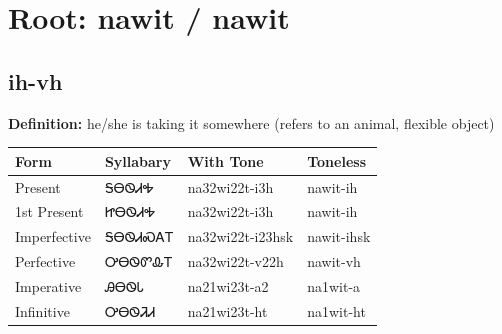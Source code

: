 \documentclass{article}%
\begin{document}
%
\normalsize%
\section*{Root: nawit / nawit}%
\subsection*{ih-vh}%
\textbf{Definition: }%
he/she is taking it somewhere (refers to an animal‚ flexible object)%
\\[0.5em]%
\begin{tabular}{|l|l|l|l|}%
\hline%
\textbf{Form}&\textbf{Syllabary}&\textbf{With Tone}&\textbf{Toneless}\\%
\hline%
Present&ᎦᎾᏫᏗᎭ&na32wi22t{-}i3h&nawit{-}ih\\%
1st Present&ᏥᎾᏫᏗᎭ&na32wi22t{-}i3h&nawit{-}ih\\%
Imperfective&ᎦᎾᏫᏗᏍᎪᎢ&na32wi22t{-}i23hsk&nawit{-}ihsk\\%
Perfective&ᎤᎾᏫᏛᎲᎢ&na32wi22t{-}v22h&nawit{-}vh\\%
Imperative&ᎯᎾᏫᏓ&na21wi23t{-}a2&na1wit{-}a\\%
Infinitive&ᎤᎾᏫᏘᏗ&na21wi23t{-}ht&na1wit{-}ht\\%
\hline%
\end{tabular}%
\\[1em]%
\end{document}
